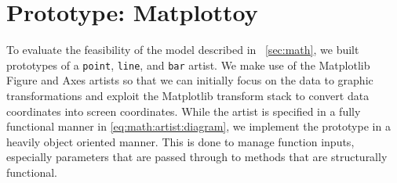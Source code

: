 \documentclass[../main.tex]{subfiles}
\begin{document}
\section{Prototype: Matplottoy}
\label{sec:implementation}
To evaluate the feasibility of the model described in ~\autoref{sec:math}, we built prototypes of a \texttt{point}, \texttt{line}, and \texttt{bar} artist. We make use of the Matplotlib Figure and Axes artists \cite{hunterArchitectureOpenSource,hunterMatplotlib2DGraphics2007} so that we can initially focus on the data to graphic transformations and exploit the Matplotlib transform stack to convert data coordinates into screen coordinates. While the artist is specified in a fully functional manner in \autoref{eq:math:artist:diagram}, we implement the  prototype in a heavily object oriented manner. This is done to manage function inputs, especially parameters that are passed through to methods that are structurally functional. 
\end{document}

